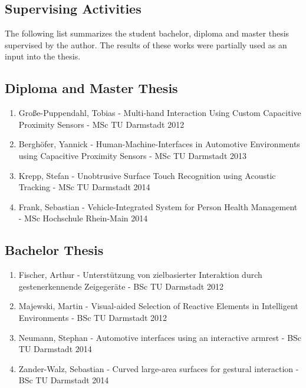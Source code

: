 \begin{appendix}
\newpage


\chapter{Supervising Activities}

The following list summarizes the student bachelor, diploma and master thesis supervised by the author. The results of these works were partially used as an input into the thesis.

\section*{Diploma and Master Thesis}

\begin{enumerate}
\item Große-Puppendahl, Tobias - Multi-hand Interaction Using Custom Capacitive Proximity Sensors - MSc TU Darmstadt 2012 
\item Berghöfer, Yannick - Human-Machine-Interfaces in Automotive Environments using Capacitive Proximity Sensors - MSc TU Darmstadt 2013
\item Krepp, Stefan - Unobtrusive Surface Touch Recognition using Acoustic Tracking - MSc TU Darmstadt 2014
\item Frank, Sebastian - Vehicle-Integrated System for Person Health Management - MSc Hochschule Rhein-Main 2014
\end{enumerate}

\section*{Bachelor Thesis}

\begin{enumerate}
\item Fischer, Arthur - Unterstützung von zielbasierter Interaktion durch gestenerkennende Zeigegeräte - BSc TU Darmstadt 2012
\item Majewski, Martin - Visual-aided Selection of Reactive Elements in Intelligent Environments - BSc TU Darmstadt 2012
\item Neumann, Stephan - Automotive interfaces using an interactive armrest - BSc TU Darmstadt 2014
\item Zander-Walz, Sebastian - Curved large-area surfaces for gestural interaction - BSc TU Darmstadt 2014
\end{enumerate}

 

\end{appendix}




